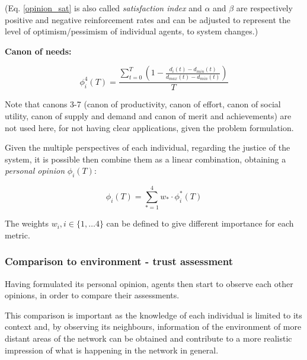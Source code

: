 \documentclass[conference,compsoc]{IEEEtran}
\begin{document}
(Eq. \ref{opinion_sat} is also called \emph{satisfaction index} and $\alpha$ and $\beta$ are respectively positive and negative reinforcement rates and can be adjusted to represent the level of optimism/pessimism of individual agents, to system changes.)




\noindent
\textbf{Canon of needs:}

\begin{equation}
  \phi_{i}^{4}(T) = \frac{\displaystyle \sum_{t=0}^T \left ( 1 - \frac{d_i(t) - d_{\textit{min}}(t)}{d_{\textit{max}}(t) - d_{\textit{min}}(t)} \right )}{T}
\label{opinion_demand}  
\end{equation}


Note that canons 3-7 (canon of productivity, canon of effort, canon of social utility, canon of supply and demand and canon of merit and achievements) are not used here, for not having clear applications, given the problem formulation.

Given the multiple perspectives of each individual, regarding the justice of the system, it is possible then combine them as a linear combination, obtaining a \emph{personal opinion} $\phi_i(T)$:


\begin{equation}
  \phi_{i}(T) = \sum_{*=1}^{4} w_{*} \cdot \phi_{i}^{*}(T)
\label{opinion_gen}  
\end{equation}

The weights $w_i, i \in \{1, \dots 4\}$ can be defined to give different importance for each metric.



\subsubsection*{Comparison to environment - trust assessment}

Having formulated its personal opinion, agents then start to observe each other opinions, in order to compare their assessments.

This comparison is important as the knowledge of each individual is limited to its context and, by observing its neighbours, information of the environment of more distant areas of the network can be obtained and contribute to a more realistic impression of what is happening in the network in general.
\end{document}
